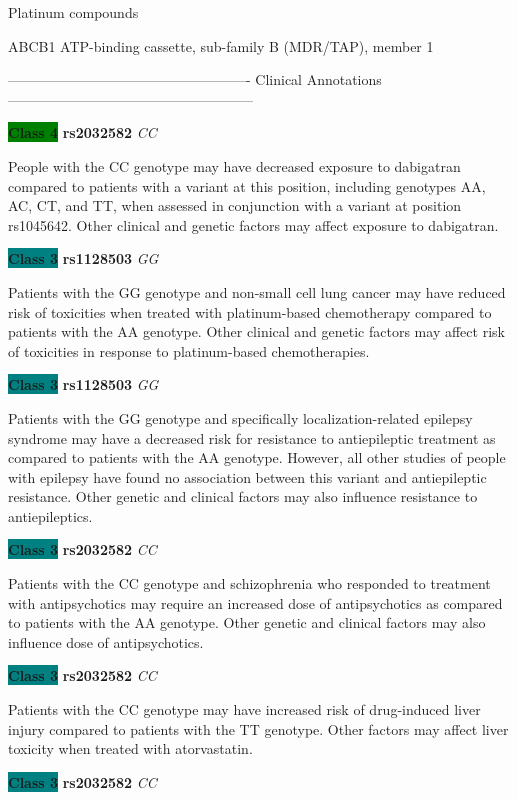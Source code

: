 \documentclass{resume} %
\begin{document}
\begin{rSection}{ Platinum compounds }
\begin{rSubsection}{ ABCB1 }{ ATP-binding cassette, sub-family B (MDR/TAP), member 1 }{}{}
\item[] ---------------------------------------------------- Clinical Annotations -----------------------------------------------------\newline
\item \textbf{\colorbox{green} {Class 4}} \textbf{ rs2032582 } \textit{ CC }
\item[] People with the CC genotype may have decreased exposure to dabigatran compared to patients with a variant at this position, including genotypes AA, AC, CT, and TT, when assessed in conjunction with a variant at position rs1045642. Other clinical and genetic factors may affect exposure to dabigatran. \item \textbf{\colorbox{teal} {Class 3}} \textbf{ rs1128503 } \textit{ GG }
\item[] Patients with the GG genotype and non-small cell lung cancer may have reduced risk of toxicities when treated with platinum-based chemotherapy compared to patients with the AA genotype. Other clinical and genetic factors may affect risk of toxicities in response to platinum-based chemotherapies.\item \textbf{\colorbox{teal} {Class 3}} \textbf{ rs1128503 } \textit{ GG }
\item[] Patients with the GG genotype and specifically localization-related epilepsy syndrome may have a decreased risk for resistance to antiepileptic treatment as compared to patients with the AA genotype. However, all other studies of people with epilepsy have found no association between this variant and antiepileptic resistance. Other genetic and clinical factors may also influence resistance to antiepileptics. \item \textbf{\colorbox{teal} {Class 3}} \textbf{ rs2032582 } \textit{ CC }
\item[] Patients with the CC genotype and schizophrenia who responded to treatment with antipsychotics may require an increased dose of antipsychotics as compared to patients with the AA genotype. Other genetic and clinical factors may also influence dose of antipsychotics.\item \textbf{\colorbox{teal} {Class 3}} \textbf{ rs2032582 } \textit{ CC }
\item[] Patients with the CC genotype may have increased risk of drug-induced liver injury compared to patients with the TT genotype. Other factors may affect liver toxicity when treated with atorvastatin.\item \textbf{\colorbox{teal} {Class 3}} \textbf{ rs2032582 } \textit{ CC }

\end{rSubsection}
\end{rSection}
\end{document}
